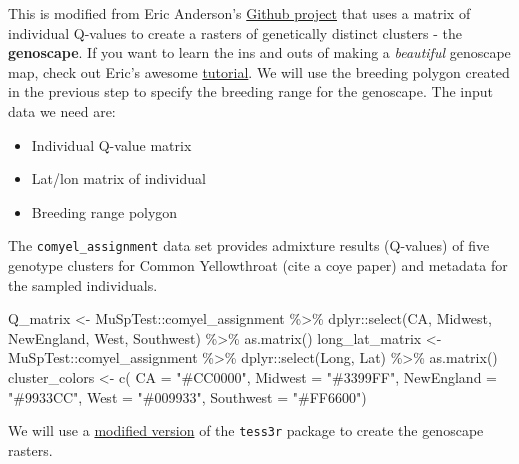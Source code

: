\documentclass[
]{book}
\newenvironment{Shaded}{\begin{snugshade}}{\end{snugshade}}
\newcommand{\AttributeTok}[1]{\textcolor[rgb]{0.77,0.63,0.00}{#1}}
\newcommand{\FunctionTok}[1]{\textcolor[rgb]{0.00,0.00,0.00}{#1}}
\newcommand{\NormalTok}[1]{#1}
\newcommand{\OtherTok}[1]{\textcolor[rgb]{0.56,0.35,0.01}{#1}}
\newcommand{\SpecialCharTok}[1]{\textcolor[rgb]{0.00,0.00,0.00}{#1}}
\newcommand{\StringTok}[1]{\textcolor[rgb]{0.31,0.60,0.02}{#1}}
\providecommand{\tightlist}{%
  \setlength{\itemsep}{0pt}\setlength{\parskip}{0pt}}
\begin{document}
This is modified from Eric Anderson's \href{https://github.com/eriqande/make-a-BGP-map}{Github project} that uses a matrix of individual Q-values to create a rasters of genetically distinct clusters - the \textbf{genoscape}. If you want to learn the ins and outs of making a \emph{beautiful} genoscape map, check out Eric's awesome \href{https://github.com/eriqande/make-a-BGP-map}{tutorial}. We will use the breeding polygon created in the previous step to specify the breeding range for the genoscape. The input data we need are:

\begin{itemize}
\tightlist
\item
  Individual Q-value matrix
\item
  Lat/lon matrix of individual
\item
  Breeding range polygon
\end{itemize}

The \texttt{comyel\_assignment} data set provides admixture results (Q-values) of five genotype clusters for Common Yellowthroat (cite a coye paper) and metadata for the sampled individuals.

\begin{Shaded}
\begin{Highlighting}[]
\NormalTok{Q\_matrix }\OtherTok{\textless{}{-}}\NormalTok{ MuSpTest}\SpecialCharTok{::}\NormalTok{comyel\_assignment }\SpecialCharTok{\%\textgreater{}\%}
\NormalTok{  dplyr}\SpecialCharTok{::}\FunctionTok{select}\NormalTok{(CA, Midwest, NewEngland, West, Southwest) }\SpecialCharTok{\%\textgreater{}\%}
  \FunctionTok{as.matrix}\NormalTok{()}
\NormalTok{long\_lat\_matrix }\OtherTok{\textless{}{-}}\NormalTok{ MuSpTest}\SpecialCharTok{::}\NormalTok{comyel\_assignment }\SpecialCharTok{\%\textgreater{}\%}
\NormalTok{  dplyr}\SpecialCharTok{::}\FunctionTok{select}\NormalTok{(Long, Lat) }\SpecialCharTok{\%\textgreater{}\%}
  \FunctionTok{as.matrix}\NormalTok{()}
\NormalTok{cluster\_colors }\OtherTok{\textless{}{-}}  \FunctionTok{c}\NormalTok{(}
  \AttributeTok{CA =} \StringTok{"\#CC0000"}\NormalTok{,}
  \AttributeTok{Midwest =} \StringTok{"\#3399FF"}\NormalTok{,}
  \AttributeTok{NewEngland =} \StringTok{"\#9933CC"}\NormalTok{,}
  \AttributeTok{West =} \StringTok{"\#009933"}\NormalTok{,}
  \AttributeTok{Southwest =} \StringTok{"\#FF6600"}\NormalTok{) }
\end{Highlighting}
\end{Shaded}

We will use a \href{https://github.com/eriqande/TESS3_encho_sen}{modified version} of the \texttt{tess3r} package to create the genoscape rasters.
\end{document}
